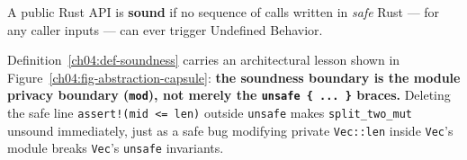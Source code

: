 \begin{definition}
\label{ch04:def-soundness}
A public Rust API is \textbf{sound} if no sequence of calls written in \emph{safe} Rust --- for any caller inputs --- can ever trigger Undefined Behavior.
\end{definition}

Definition~\ref{ch04:def-soundness} carries an architectural lesson shown in Figure~\ref{ch04:fig-abstraction-capsule}: \textbf{the soundness boundary is the module privacy boundary (\texttt{mod}), not merely the \texttt{unsafe \{ ... \}} braces.} Deleting the safe line \texttt{assert!(mid <= len)} outside \texttt{unsafe} makes \texttt{split\_two\_mut} unsound immediately, just as a safe bug modifying private \texttt{Vec::len} inside \texttt{Vec}'s module breaks \texttt{Vec}'s \texttt{unsafe} invariants.


